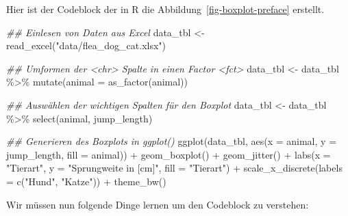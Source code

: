 \documentclass[
  letterpaper,
]{scrbook}
\newenvironment{Shaded}{\begin{snugshade}}{\end{snugshade}}
\newcommand{\AttributeTok}[1]{\textcolor[rgb]{0.40,0.45,0.13}{#1}}
\newcommand{\DocumentationTok}[1]{\textcolor[rgb]{0.37,0.37,0.37}{\textit{#1}}}
\newcommand{\FunctionTok}[1]{\textcolor[rgb]{0.28,0.35,0.67}{#1}}
\newcommand{\NormalTok}[1]{\textcolor[rgb]{0.00,0.23,0.31}{#1}}
\newcommand{\OtherTok}[1]{\textcolor[rgb]{0.00,0.23,0.31}{#1}}
\newcommand{\SpecialCharTok}[1]{\textcolor[rgb]{0.37,0.37,0.37}{#1}}
\newcommand{\StringTok}[1]{\textcolor[rgb]{0.13,0.47,0.30}{#1}}
\begin{document}
Hier ist der Codeblock der in R die Abbildung~\ref{fig-boxplot-preface}
erstellt.

\begin{Shaded}
\begin{Highlighting}[]
\DocumentationTok{\#\# Einlesen von Daten aus Excel}
\NormalTok{data\_tbl }\OtherTok{\textless{}{-}} \FunctionTok{read\_excel}\NormalTok{(}\StringTok{"data/flea\_dog\_cat.xlsx"}\NormalTok{)}

\DocumentationTok{\#\# Umformen der \textless{}chr\textgreater{} Spalte in einen Factor \textless{}fct\textgreater{}}
\NormalTok{data\_tbl }\OtherTok{\textless{}{-}}\NormalTok{ data\_tbl }\SpecialCharTok{\%\textgreater{}\%} 
  \FunctionTok{mutate}\NormalTok{(}\AttributeTok{animal =} \FunctionTok{as\_factor}\NormalTok{(animal))}

\DocumentationTok{\#\# Auswählen der wichtigen Spalten für den Boxplot}
\NormalTok{data\_tbl }\OtherTok{\textless{}{-}}\NormalTok{ data\_tbl }\SpecialCharTok{\%\textgreater{}\%} 
  \FunctionTok{select}\NormalTok{(animal, jump\_length) }

\DocumentationTok{\#\# Generieren des Boxplots in ggplot()}
\FunctionTok{ggplot}\NormalTok{(data\_tbl, }\FunctionTok{aes}\NormalTok{(}\AttributeTok{x =}\NormalTok{ animal, }\AttributeTok{y =}\NormalTok{ jump\_length, }
                     \AttributeTok{fill =}\NormalTok{ animal)) }\SpecialCharTok{+}
  \FunctionTok{geom\_boxplot}\NormalTok{() }\SpecialCharTok{+}
  \FunctionTok{geom\_jitter}\NormalTok{() }\SpecialCharTok{+}
  \FunctionTok{labs}\NormalTok{(}\AttributeTok{x =} \StringTok{"Tierart"}\NormalTok{, }\AttributeTok{y =} \StringTok{"Sprungweite in [cm]"}\NormalTok{, }
       \AttributeTok{fill =} \StringTok{"Tierart"}\NormalTok{) }\SpecialCharTok{+}
  \FunctionTok{scale\_x\_discrete}\NormalTok{(}\AttributeTok{labels =} \FunctionTok{c}\NormalTok{(}\StringTok{"Hund"}\NormalTok{, }\StringTok{"Katze"}\NormalTok{)) }\SpecialCharTok{+}
  \FunctionTok{theme\_bw}\NormalTok{()}
\end{Highlighting}
\end{Shaded}

Wir müssen nun folgende Dinge lernen um den Codeblock zu verstehen:
\end{document}

